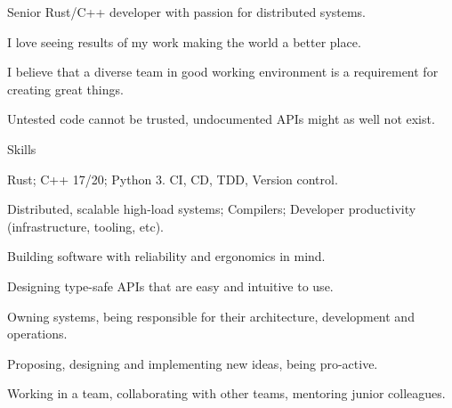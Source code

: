 \documentclass{resume}
\begin{document}
    Senior Rust/C++ developer with passion for distributed systems.
    
    I love seeing results of my work making the world a better place.
    
    I believe that a diverse team in good working environment
    is a requirement for creating great things.
    
    Untested code cannot be trusted, undocumented APIs might
    as well not exist.

    \begin{rSection}{Skills}
        \begin{rSubsection}{}{}{}{}
            \item
                Rust;
                C++ 17/20;
                Python 3.
                CI, CD, TDD, Version control.
            \item
                Distributed, scalable high-load systems;
                Compilers;
                Developer productivity
                (infrastructure, tooling, etc).
        \end{rSubsection}
        \begin{rSubsection}{}{}{}{}
            \item
                Building software with reliability and ergonomics in mind.
            \item
                Designing type-safe APIs that are easy and intuitive to use.
        \end{rSubsection}
        \begin{rSubsection}{}{}{}{}
            \item
                Owning systems,
                being responsible for their architecture, development and operations.
            \item
                Proposing, designing and implementing new ideas,
                being pro-active.
            \item
                Working in a team,
                collaborating with other teams,
                mentoring junior colleagues.
        \end{rSubsection}
    \end{rSection}
\end{document}
